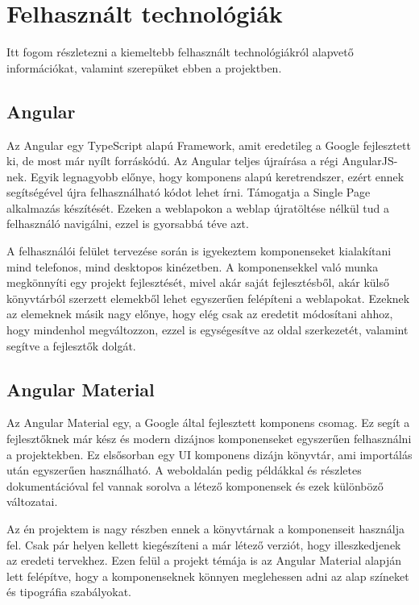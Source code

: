 \documentclass[12pt]{report}
\theoremstyle{definition}
\begin{document}


\chapter{Felhasznált technológiák}
Itt fogom részletezni a kiemeltebb felhasznált technológiákról alapvető információkat, valamint szerepüket ebben a projektben.

\section{Angular}
Az Angular egy TypeScript alapú Framework, amit  eredetileg a Google fejlesztett ki, de most már nyílt forráskódú. Az Angular teljes újraírása a régi AngularJS-nek. Egyik legnagyobb előnye, hogy komponens alapú keretrendszer, ezért ennek segítségével újra felhasználható kódot lehet írni. Támogatja a Single Page alkalmazás készítését. Ezeken a weblapokon a weblap újratöltése nélkül tud a felhasználó navigálni, ezzel is gyorsabbá téve azt.

A felhasználói felület tervezése során is igyekeztem komponenseket kialakítani mind telefonos, mind desktopos kinézetben. A komponensekkel való munka megkönnyíti egy projekt fejlesztését, mivel akár saját fejlesztésből, akár külső könyvtárból szerzett elemekből lehet egyszerűen felépíteni a weblapokat. Ezeknek az elemeknek másik nagy előnye, hogy elég csak az eredetit módosítani ahhoz, hogy mindenhol megváltozzon, ezzel is egységesítve az oldal szerkezetét, valamint segítve a fejlesztők dolgát.


\section{Angular Material}
Az Angular Material egy, a Google által fejlesztett komponens csomag. Ez segít a fejlesztőknek már kész és modern dizájnos komponenseket egyszerűen felhasználni a projektekben. Ez elsősorban egy UI komponens dizájn könyvtár, ami importálás után egyszerűen használható. A weboldalán pedig példákkal és részletes dokumentációval fel vannak sorolva a létező komponensek és ezek különböző változatai.

Az én projektem is nagy részben ennek a könyvtárnak a komponenseit használja fel. Csak pár helyen kellett kiegészíteni a már létező verziót, hogy illeszkedjenek az eredeti tervekhez. Ezen felül a projekt témája is az Angular Material alapján lett felépítve, hogy a komponenseknek könnyen meglehessen adni az alap színeket és tipográfia szabályokat.
\end{document}
